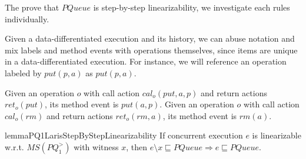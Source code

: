 The prove that $\textit{PQueue}$ is step-by-step linearizability, we investigate each rules individually.

Given a data-differentiated execution and its history, we can abuse notation and mix labels and method events with operations themselves, since items are unique in a data-differentiated execution. For instance, we will reference an operation labeled by $\textit{put}(p,a)$ as $\textit{put}(p,a)$.


Given an operation $o$ with call action $\textit{cal}_o (\textit{put},a,p)$ and return actions $\textit{ret}_o (\textit{put})$, its method event is $\textit{put}(a,p)$. Given an operation $o$ with call action $\textit{cal}_o (\textit{rm})$ and return actions $\textit{ret}_o (\textit{rm},a)$, its method event is $\textit{rm}(a)$.

\begin{restatable}{lemma}{PQ1LarisStepByStepLinearizability}
\label{lemma:PQ1Lar is step-by-step linearizability}
If concurrent execution $e$ is linearizable w.r.t. $\textit{MS}(\textit{PQ}_1^{>})$ with witness $x$, then $e \setminus x \sqsubseteq \textit{PQueue} \Rightarrow e \sqsubseteq \textit{PQueue}$.
\end{restatable}

